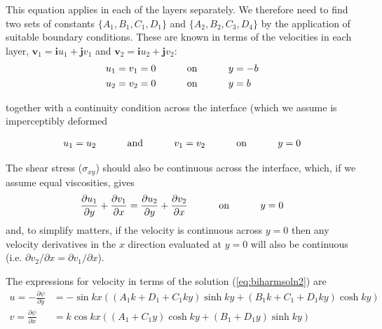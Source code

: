 \documentclass[10pt]{article}
\begin{document}
{	This equation applies in each of the layers separately. We therefore need to find
	two sets of constants $\{A_1,B_1,C_1,D_1\}$ and $\{A_2,B_2,C_3,D_4\}$ by the
	application of suitable boundary conditions. These are known in terms of the
	velocities in each layer, $\mathbf{v}_1 = \mathbf{i} u_1 +\mathbf{j} v_1$ and
	$\mathbf{v}_2 = \mathbf{i} u_2 +\mathbf{j} v_2$:
			\begin{align}
				u_1 = v_1 &= 0 \text{\hspace{1cm} on \hspace{1cm}} y = -b \\
				u_2 = v_2 &= 0 \text{\hspace{1cm} on \hspace{1cm}} y = b 
			\end{align}
		
	together with a continuity condition across the interface (which we 
	assume is imperceptibly deformed} 	
		\begin{equation}
				u_1 = u_2  \text{\hspace{1cm} and \hspace{1cm}} 
				v_1 = v_2 \text{\hspace{1cm} on \hspace{1cm}} y = 0 
		\end{equation}
	
	The shear stress ($\sigma_{xy}$) should also be continuous across the interface,
	which, if we assume equal viscosities, gives
		\begin{equation}
			\frac{\partial u_1}{\partial y} + \frac{\partial v_1}{\partial x} =
			\frac{\partial u_2}{\partial y} + \frac{\partial v_2}{\partial x} \text{\hspace{1cm} on \hspace{1cm}} y = 0 
		\end{equation}
	and, to simplify matters, if the velocity is continuous across $y=0$ then any 
	velocity derivatives in the $x$ direction evaluated at $y=0$ will also be
	continuous (i.e. $\partial v_2 / \partial x = \partial v_1 / \partial x$).
		
	The expressions for velocity in terms of the solution (\ref{eq:biharmsoln2}) are
		\begin{subequations}
			\begin{align}
				u  = -\frac{\partial \psi}{\partial y} & = -\sin kx \left( 
								(A_1 k + D_1 + C_1 k y) \sinh ky + (B_1 k + C_1 + D_1 ky) \cosh ky	\right) \\
				v  = \frac{\partial \psi}{\partial x} & = k \cos kx \left( 
								(A_1 +C_1 y)\cosh ky + (B_1 +D_1 y)  \sinh ky 	\right)
			\end{align}
		\end{subequations}	
		
\end{document}
